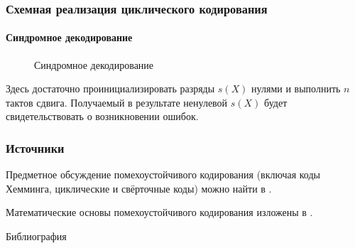\begin{frame}
    \frametitle{Схемная реализация циклического кодирования}
    \framesubtitle{Синдромное декодирование}
    
    \begin{figure}
        \begin{center}
            \caption{Синдромное декодирование}\label{pict:lfsrDecode}
        \end{center}
    \end{figure} 
\end{frame}

Здесь достаточно проинициализировать разряды $s(X)$ нулями и выполнить $n$ тактов сдвига. Получаемый в результате ненулевой $s(X)$ будет свидетельствовать о возникновении ошибок.

\appendix %


\begin{frame}
    \frametitle{Источники}
    
    Предметное обсуждение помехоустойчивого кодирования (включая коды Хемминга, циклические и свёрточные коды) можно найти в \cite{bib:verner:codingBase}.
    
    Математические основы помехоустойчивого кодирования изложены в \cite{bib:novic:discrmathprogrammer,bib:yablonsky:discreteintro}.
\end{frame}


\begin{frame}[allowframebreaks]{Библиография}
    
    
\end{frame}

